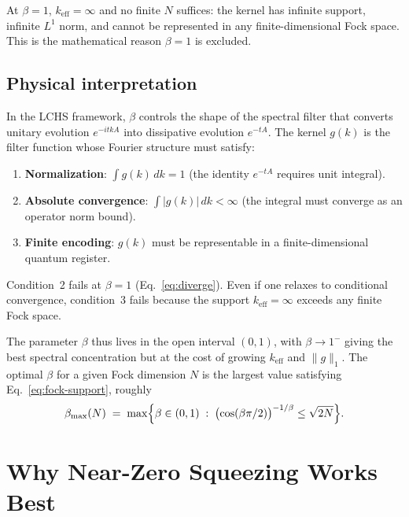 \documentclass[11pt]{article}
\begin{document}
At $\beta = 1$, $k_{\mathrm{eff}} = \infty$ and no finite $N$ suffices:
the kernel has infinite support, infinite $L^1$ norm, and cannot be
represented in any finite-dimensional Fock space.  This is the
mathematical reason $\beta = 1$ is excluded.

\subsection{Physical interpretation}

In the LCHS framework, $\beta$ controls the shape of the spectral
filter that converts unitary evolution $e^{-itkA}$ into dissipative
evolution $e^{-tA}$.  The kernel $g(k)$ is the filter function whose
Fourier structure must satisfy:
\begin{enumerate}[itemsep=2pt]
  \item \textbf{Normalization}: $\int g(k)\,dk = 1$ (the identity
        $e^{-tA}$ requires unit integral).
  \item \textbf{Absolute convergence}: $\int |g(k)|\,dk < \infty$
        (the integral must converge as an operator norm bound).
  \item \textbf{Finite encoding}: $g(k)$ must be representable in
        a finite-dimensional quantum register.
\end{enumerate}

Condition~2 fails at $\beta = 1$ (Eq.~\ref{eq:diverge}).
Even if one relaxes to conditional convergence, condition~3 fails
because the support $k_{\mathrm{eff}} = \infty$ exceeds any finite
Fock space.

The parameter $\beta$ thus lives in the open interval $(0,1)$, with
$\beta \to 1^-$ giving the best spectral concentration but at the
cost of growing $k_{\mathrm{eff}}$ and $\|g\|_1$.  The optimal $\beta$
for a given Fock dimension $N$ is the largest value satisfying
Eq.~\eqref{eq:fock-support}, roughly
\begin{equation}\label{eq:beta-opt}
  \beta_{\max}(N) \;=\; \max\Bigl\{\beta \in (0,1)
  \;:\; \bigl(\cos(\beta\pi/2)\bigr)^{-1/\beta} \le \sqrt{2N}\Bigr\}.
\end{equation}

\section{Why Near-Zero Squeezing Works Best}
\end{document}

